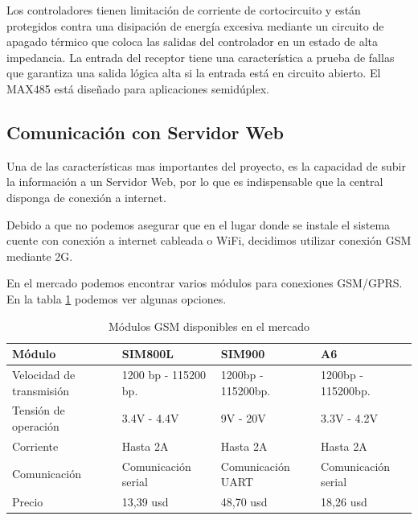 Los controladores tienen limitación de corriente de cortocircuito y están protegidos
contra una disipación de energía excesiva mediante un circuito de apagado térmico que coloca las salidas del controlador en un estado de alta 
impedancia. La entrada del receptor tiene una característica a prueba de fallas que garantiza una salida lógica alta si la entrada está en 
circuito abierto. El MAX485 está diseñado para aplicaciones semidúplex.


\subsection{Comunicación con Servidor Web}

Una de las características mas importantes del proyecto, es la capacidad de subir la información a un Servidor Web, por lo que es indispensable que la central disponga
de conexión a internet.\par
Debido a que no podemos asegurar que en el lugar donde se instale el sistema cuente con conexión a internet cableada o WiFi, decidimos utilizar conexión GSM mediante 2G. \par
En el mercado podemos encontrar varios módulos para conexiones GSM/GPRS. En la tabla \ref{tab:gsm} podemos ver algunas opciones.

\begin{table}[t]
    \begin{center}
        \begin{tabular}{ | m{3cm} | m{3cm} | m{3cm} | m{3cm} | }
        \hline Módulo & SIM800L & SIM900 & A6  \\ \hline
        Velocidad de transmisión & 1200 bp - 115200 bp. & 1200bp - 115200bp. & 1200bp - 115200bp. \\ \hline
        Tensión de operación & 3.4V - 4.4V & 9V - 20V & 3.3V - 4.2V \\ \hline
        Corriente & Hasta 2A & Hasta 2A & Hasta 2A\\ \hline
        Comunicación & Comunicación serial &Comunicación UART & Comunicación serial\\ \hline
        Precio & 13,39 usd &  48,70 usd & 18,26 usd\\ \hline
        
        \end{tabular}
        \caption{Módulos GSM disponibles en el mercado}
        \label{tab:gsm}   
    \end{center}
\end{table}

